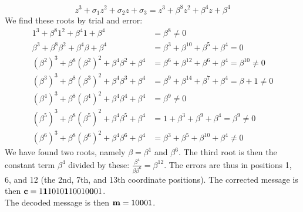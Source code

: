 \documentclass[11pt]{article}
\renewcommand{\vec}[1]{\mathbf{#1}}
\begin{document}
\begin{itemize}
                  \[
                      z^3 + \sigma_1 z^2 + \sigma_2 z + \sigma_3
                    = z^3 + \beta^8 z^2 + \beta^4 z + \beta^4
                  \]
                  We find these roots by trial and error:
                  \begin{align*}
                       1^3 + \beta^8 1^2 + \beta^4 1 + \beta^4
                    &= \beta^8
                     \neq 0\\
                       \beta^3 + \beta^8 \beta^2 + \beta^4 \beta + \beta^4
                    &= \beta^3 + \beta^{10} + \beta^5 + \beta^4
                     = 0\\
                       (\beta^2)^3 + \beta^8 (\beta^2)^2 + \beta^4 \beta^2 + \beta^4
                    &=  \beta^6 + \beta^{12} + \beta^6 + \beta^4
                     = \beta^{10}
                     \neq 0\\
                       (\beta^3)^3 + \beta^8 (\beta^3)^2 + \beta^4 \beta^3 + \beta^4
                    &=  \beta^9 + \beta^{14} + \beta^7 + \beta^4
                     = \beta+1
                     \neq 0\\
                       (\beta^4)^3 + \beta^8 (\beta^4)^2 + \beta^4 \beta^4 + \beta^4
                    &=  \beta^9
                     \neq 0\\
                       (\beta^5)^3 + \beta^8 (\beta^5)^2 + \beta^4 \beta^5 + \beta^4
                    &=  1 + \beta^3 + \beta^9 + \beta^4
                     =  \beta^9
                     \neq 0\\
                       (\beta^6)^3 + \beta^8 (\beta^6)^2 + \beta^4 \beta^6 + \beta^4
                    &=  \beta^3 + \beta^5 + \beta^{10} + \beta^4
                     \neq 0
                  \end{align*}
                  We have found two roots, namely $\beta = \beta^1$ and $\beta^6$.
                  The third root is then the constant term $\beta^4$ divided by these:
                  $\frac{\beta^4}{\beta\beta^6} = \beta^{12}$.
                  The errors are thus in positions 1, 6, and 12 (the 2nd, 7th, and 13th coordinate positions).
                  The corrected message is then
                  $\vec{c} = \text{1{\bf1}1010{\bf1}10010{\bf0}01}$.\\
                   The decoded message is then $\vec{m} = \text{10{\bf0}01}$.
\end{itemize}
\end{document}
